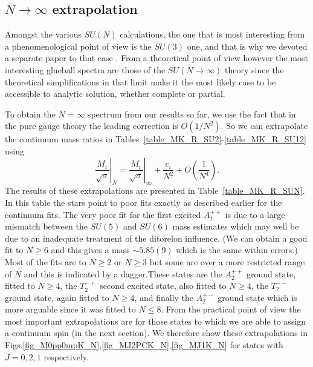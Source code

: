 \documentclass[12pt]{article}
\newcommand{\be}{\begin{equation}}
\newcommand{\ee}{\end{equation}}
\begin{document}
%
%
\subsection{$N\to\infty$ extrapolation}
\label{subsection_masslargeN} 

Amongst the various $SU(N)$ calculations, the one that is most interesting
from a phenomenological point of view is the $SU(3)$ one, and that is why we
devoted a separate paper to that case
%
\cite{AAMT-2020}.
%
From a theoretical point of view however the most interesting glueball spectra
are those of the $SU(N\to\infty)$ theory since the theoretical simplifications
in that limit make it the most likely case to be accessible to analytic
solution, whether complete or partial.

To obtain the $N=\infty$ spectrum from our results so far, we use the fact that
in the pure gauge theory the leading correction is $O(1/N^2)$. So we can extrapolate
the continuum mass ratios in Tables~\ref{table_MK_R_SU2}-\ref{table_MK_R_SU12}
using
%
\be
\left.\frac{M_i}{\surd\sigma}\right|_{N}
=
\left.\frac{M_i}{\surd\sigma}\right|_{\infty}
+ \frac{c_i}{N^2} + O\left(\frac{1}{N^4}\right).
\label{eqn_MKN}
\ee
%
The results of these extrapolations are presented in Table~\ref{table_MK_R_SUN}.
In this table the stars point to poor fits exactly as described earlier for the continuum fits.
The very poor fit for the first excited $A_1^{++}$ is due to a large mismatch between
the $SU(5)$ and $SU(6)$ mass estimates which may well be due to an inadequate treatment
of the ditorelon influence. (We can obtain a good fit to $N\geq 6$ and this
gives a mass $\sim 5.85(9)$ which  is the same within errors.)
Most of the fits are to $N\geq 2$ or $N\geq 3$ but some are over a more restricted range of
$N$ and this is indicated by a dagger.These states are the  $A_2^{++}$ ground state, fitted to $N\geq 4$,
the $T_2^{-+}$ second excited  state, also fitted to $N\geq 4$, the $T_2^{--}$ ground  state,
again fitted to $N\geq 4$, and finally the $A_2^{+-}$ ground state which is more arguable
since it was fitted to $N\leq 8$. From the practical point of view the most important
extrapolations are for those states to which we are able to assign a continuum spin
(in the next section). We therefore show these extrapolations in
Figs.\ref{fig_M0pp0mpK_N},\ref{fig_MJ2PCK_N},\ref{fig_MJ1K_N}
for states with $J=0,2,1$ respectively.
\end{document}
